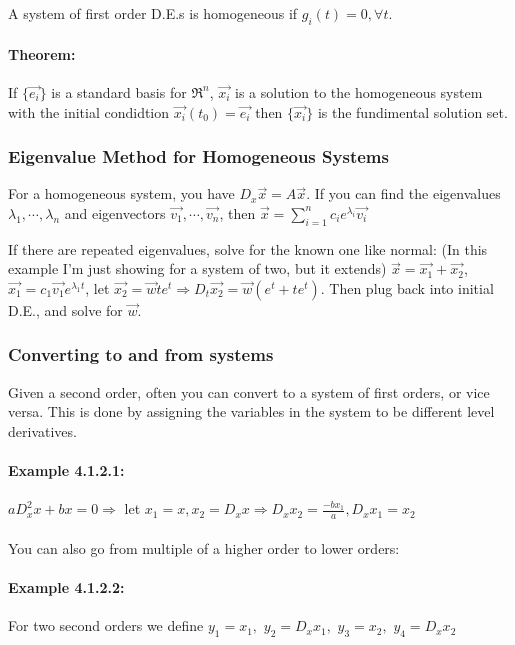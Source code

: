 \documentclass{article}
\begin{document}
\subparagraph{}
A system of first order D.E.s is homogeneous if $g_i(t)=0, \forall t$.

\paragraph{Theorem:}
If $\{\vec{e_i}\}$ is a standard basis for $\Re ^n$, $\vec{x_i}$ is a solution to the homogeneous system with the initial condidtion $\vec{x_i} (t_0) = \vec{e_i}$ then $\{\vec{x_i}\}$ is the fundimental solution set.

\subsubsection{Eigenvalue Method for Homogeneous Systems}
For a homogeneous system, you have $D_x \vec{x}=A \vec{x} $.  If you can find the eigenvalues $\lambda_1, \cdots, \lambda_n$ and eigenvectors $\vec{v_1}, \cdots, \vec{v_n}$, then $\vec{x}= \sum\limits_{i=1}^n c_i e^{\lambda_i} \vec{v_i} $

If there are repeated eigenvalues, solve for the known one like normal: (In this example I'm just showing for a system of two, but it extends) $\vec{x}=\vec{x_1} + \vec{x_2}$, $\vec{x_1}=c_1 \vec{v_1} e^{\lambda_1 t} $, let $\vec{x_2}=\vec{w} t e^t \Rightarrow D_t \vec{x_2} = \vec{w} (e^t + te^t)$.  Then plug back into initial D.E., and solve for $\vec{w}$.

\subsubsection{Converting to and from systems}
Given a second order, often you can convert to a system of first orders, or vice versa.  This is done by assigning the variables in the system to be different level derivatives.
\paragraph{Example 4.1.2.1:}
$a D_x^2 x + bx = 0 \Rightarrow$ let $x_1=x, x_2=D_x x \Rightarrow D_x x_2 = \frac{-b x_1}{a}, D_x x_1 = x_2$
\paragraph{}
You can also go from multiple of a higher order to lower orders:
\paragraph{Example 4.1.2.2:}
For two second orders we define $y_1=x_1,$ $y_2=D_x x_1,$ $y_3 = x_2,$ $y_4 = D_x x_2$
\end{document}
